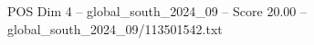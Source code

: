 \begin{textsample}{POS Dim 4 – global\_south\_2024\_09 – Score 20.00 – global\_south\_2024\_09/113501542.txt}
\end{textsample}
